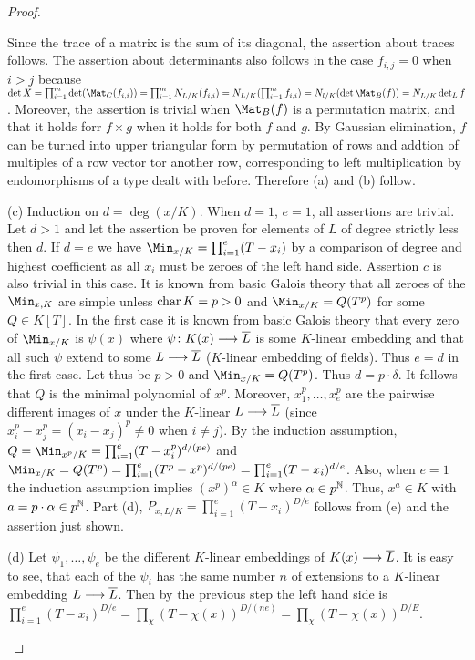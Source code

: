 \documentclass[a4paper,parskip=full,numbers=enddot]{scrreprt}
\begin{document}
\begin{proof}
\begin{alphanumerate}
            Since the trace of a matrix is the sum of its diagonal, the assertion about traces follows. The assertion about determinants also follows in the case $f_{i,j}=0$ when $i>j$ because $\det X = \prod_{i=1}^m \det(\Mat_C(f_{i,i})) = \prod_{i=1}^m N_{L/K} (f_{i,i}) = N_{L/K}(\prod_{i=1}^m f_{i,i}) = N_{l/K}(\det\Mat_B(f)) = N_{L/K} \det_L f$. Moreover, the assertion is trivial when $\Mat_B(f)$ is a permutation matrix, and that it holds forr $f\times g$ when it holds for both $f$ and $g$. By Gaussian elimination, $f$ can be turned into upper triangular form by permutation of rows and addtion of multiples of a row vector tor another row, corresponding to left multiplication by endomorphisms of a type dealt with before. Therefore (a) and (b) follow.
        \item[(c)]
            Induction on $d=\deg(x/K)$. When $d=1$, $e=1$, all assertions are trivial. Let $d>1$ and let the assertion be proven for elements of $L$ of degree strictly less then $d$. If $d=e$ we have $\Min_{x/K} = \prod_{i=1}^e (T-x_i)$ by a comparison of degree and highest coefficient as all $x_i$ must be zeroes of the left hand side. Assertion $c$ is also trivial in this case. It is known from basic Galois theory that all zeroes of the $\Min_{x,K}$ are simple unless $\operatorname{char} K =p > 0$ and $\Min_{x/K} = Q(T^p)$ for some $Q\in K[T]$. In the first case it is known from basic Galois theory that every zero of $\Min_{x/K}$ is $\psi(x)$ where $\psi\colon K(x) \overset{}{\longrightarrow} \overline{L}$ is some $K$-linear embedding and that all such $\psi$ extend to some $L\overset{}{\longrightarrow} \overline{L}$ ($K$-linear embedding of fields). Thus $e=d$ in the first case. Let thus be $p>0$ and $\Min_{x/K}=Q(T^p)$. Thus $d=p\cdot\delta$. It follows that $Q$ is the minimal polynomial of $x^p$. Moreover, $x_1^p,\ldots, x_e^p$ are the pairwise different images of $x$ under the $K$-linear $L\overset{}{\longrightarrow} \overline{L}$ (since $x_i^p-x_j^p = (x_i-x_j)^p \neq 0$ when $i\neq j$). By the induction assumption, $Q= \Min_{x^p/K} = \prod_{i=1}^e(T-x_i^p)^{d/(pe)}$ and $\Min_{x/K} = Q(T^p) = \prod_{i=1}^e(T^p-x^p)^{d/(pe)} = \prod_{i=1}^e (T-x_i)^{d/e}$. Also, when $e=1$ the induction assumption implies $(x^p)^\alpha\in K$ where $\alpha\in p^{\mathbb{N}}$. Thus, $x^a\in K$ with $a=p\cdot\alpha\in p^{\mathbb{N}}$. Part (d), $P_{x,L/K}=\prod_{i=1}^e (T-x_i)^{D/e}$ follows from (e) and the assertion just shown.
        \item[(d)]
            Let $\psi_1,\ldots,\psi_e$ be the different $K$-linear embeddings of $K(x)\overset{}{\longrightarrow} \overline{L}$. It is easy to see, that each of the $\psi_i$ has the same number $n$ of extensions to a $K$-linear embedding $L\overset{}{\longrightarrow} \overline{L}$. Then by the previous step the left hand side is $\prod_{i=1}^e(T-x_i)^{D/e} = \prod_\chi (T-\chi(x))^{D/(ne)} = \prod_\chi (T-\chi(x))^{D/E}$.
        \end{alphanumerate}
    \end{proof}
    
\end{document}
